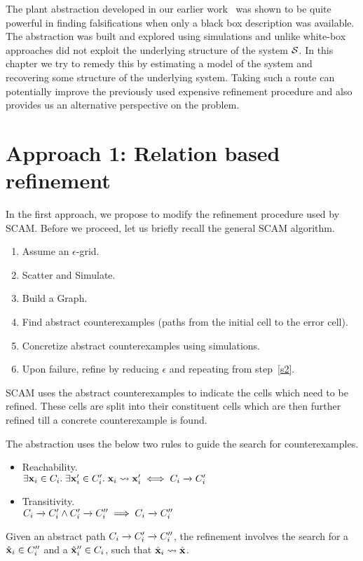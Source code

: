 The plant abstraction developed in our earlier
work~\cite{zutshi2014multiple} was shown to be quite powerful in
finding falsifications when only a black box description was
available. The abstraction was built and explored using simulations
and unlike white-box approaches did not exploit the underlying
structure of the system $\mathcal{S}$. In this chapter we try to remedy this
by estimating a model of the system and recovering some structure of
the underlying system. Taking such a route can potentially improve the
previously used expensive refinement procedure and also provides us an
alternative perspective on the problem.

\section{Approach 1: Relation based refinement}
In the first approach, we propose to modify the refinement procedure
used by SCAM. Before we proceed, let us briefly recall the general
SCAM algorithm.

\begin{enumerate}
    \item Assume an $\epsilon$-grid.
    \item Scatter and Simulate.\label{s2}
    \item Build a Graph.
    \item Find abstract counterexamples (paths from the initial cell
        to the error cell).
    \item Concretize abstract counterexamples using simulations.
    \item Upon failure, refine by reducing $\epsilon$ and
        repeating from step~\ref{s2}.
\end{enumerate}

SCAM uses the abstract counterexamples to indicate the cells which
need to be refined. These cells are split into their constituent cells
which are then further refined till a concrete counterexample is
found.

The abstraction uses the below two rules to guide the search for
counterexamples.
\begin{itemize}
    \item Reachability.\\
        $\exists \mathbf{x}_i \in C_i.\; \exists \mathbf{x}'_i \in C'_i.\;
        \mathbf{x}_i \overset{}{\rightsquigarrow} \mathbf{x}'_i \iff C_i \xrightarrow{} C'_i$

    \item Transitivity.\\
        $C_i \xrightarrow{} C'_i \wedge C'_i \xrightarrow{} C''_i \implies C_i \xrightarrow{} C''_i$
\end{itemize}
Given an abstract path $C_i\xrightarrow{}C'_i\xrightarrow{}C''_i$, the
refinement involves the search for a $\hat{\mathbf{x}}_i \in C''_i$ and a
$\hat{\mathbf{x}}''_i \in C_i$, such that $\hat{\mathbf{x}}_i \overset{}{\rightsquigarrow} \hat{\mathbf{x}}$.

